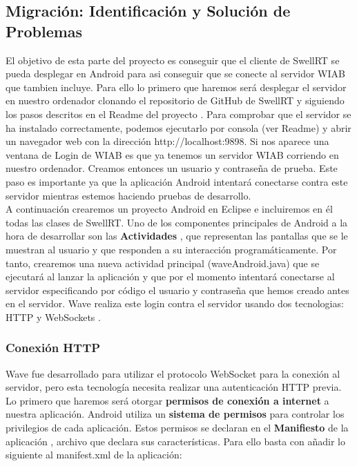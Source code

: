 	\subsection{Migración: Identificación y Solución de Problemas}
  
	  El objetivo de esta parte del proyecto es conseguir que el cliente de SwellRT se pueda desplegar en Android para asi conseguir que se conecte al servidor WIAB que tambien incluye. Para ello lo primero que haremos será desplegar el servidor en nuestro ordenador clonando el repositorio de GitHub de SwellRT y siguiendo los pasos descritos en el Readme del proyecto \cite{ref:swellRT_github}. Para comprobar que el servidor se ha instalado correctamente, podemos ejecutarlo por consola (ver Readme) y abrir un navegador web con la dirección http://localhost:9898. Si nos aparece una ventana de Login de WIAB es que ya tenemos un servidor WIAB corriendo en nuestro ordenador. Creamos entonces un usuario y contraseña de prueba. Este paso es importante ya que la aplicación Android intentará conectarse contra este servidor mientras estemos haciendo pruebas de desarrollo. \\[.2cm]
	  
	  A continuación crearemos un proyecto Android en Eclipse e incluiremos en él todas las clases de SwellRT. Uno de los componentes principales de Android a la hora de desarrollar son las \textbf{Actividades} \cite{ref:android_activities}, que representan las pantallas que se le muestran al usuario y que responden a su interacción programáticamente. Por tanto, crearemos una nueva actividad  
	  principal (waveAndroid.java) que se ejecutará al lanzar la aplicación y que por el momento intentará conectarse al servidor especificando por código el usuario y contraseña que hemos creado antes en el servidor. Wave realiza este login contra el servidor usando dos tecnologias: HTTP \cite{ref:http_authentication} y WebSockets \cite{ref:webSocket_ref}.
	  
  
    		\subsubsection{Conexión HTTP}\label{sssec:conHttp}
	
	Wave fue desarrollado para utilizar el protocolo WebSocket para la conexión al servidor, pero esta tecnología necesita realizar una autenticación HTTP previa. Lo primero que haremos será otorgar \textbf{permisos de conexión a internet} a nuestra aplicación. Android utiliza un \textbf{sistema de permisos} \cite{ref:android_permissions} para controlar los privilegios de cada aplicación. Estos permisos se declaran en el \textbf{Manifiesto} de la aplicación \cite{ref:android_manifest}, archivo que declara sus características. Para ello basta con añadir lo siguiente al manifest.xml de la aplicación:
	  
